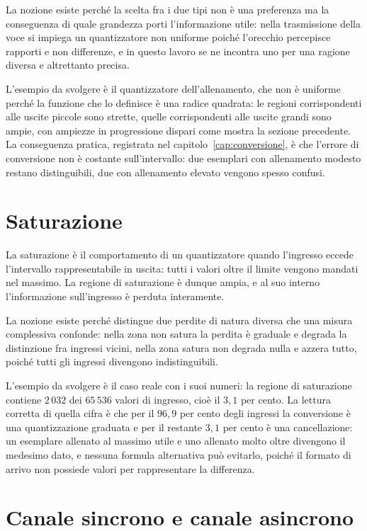 La nozione esiste perché la scelta fra i due tipi non è una preferenza ma la conseguenza di quale grandezza porti l'informazione utile: nella trasmissione della voce si impiega un quantizzatore non uniforme poiché l'orecchio percepisce rapporti e non differenze, e in questo lavoro se ne incontra uno per una ragione diversa e altrettanto precisa.

L'esempio da svolgere è il quantizzatore dell'allenamento, che non è uniforme perché la funzione che lo definisce è una radice quadrata: le regioni corrispondenti alle uscite piccole sono strette, quelle corrispondenti alle uscite grandi sono ampie, con ampiezze in progressione dispari come mostra la sezione precedente. La conseguenza pratica, registrata nel capitolo~\ref{cap:conversione}, è che l'errore di conversione non è costante sull'intervallo: due esemplari con allenamento modesto restano distinguibili, due con allenamento elevato vengono spesso confusi.

\section{Saturazione}

La saturazione è il comportamento di un quantizzatore quando l'ingresso eccede l'intervallo rappresentabile in uscita: tutti i valori oltre il limite vengono mandati nel massimo. La regione di saturazione è dunque ampia, e al suo interno l'informazione sull'ingresso è perduta interamente.

La nozione esiste perché distingue due perdite di natura diversa che una misura complessiva confonde: nella zona non satura la perdita è graduale e degrada la distinzione fra ingressi vicini, nella zona satura non degrada nulla e azzera tutto, poiché tutti gli ingressi divengono indistinguibili.

L'esempio da svolgere è il caso reale con i suoi numeri: la regione di saturazione contiene $2\,032$ dei $65\,536$ valori di ingresso, cioè il $3{,}1$ per cento. La lettura corretta di quella cifra è che per il $96{,}9$ per cento degli ingressi la conversione è una quantizzazione graduata e per il restante $3{,}1$ per cento è una cancellazione: un esemplare allenato al massimo utile e uno allenato molto oltre divengono il medesimo dato, e nessuna formula alternativa può evitarlo, poiché il formato di arrivo non possiede valori per rappresentare la differenza.

\section{Canale sincrono e canale asincrono}

